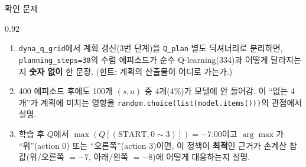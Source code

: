 \begin{frame}{확인 문제}
\begin{center}\begin{varwidth}{0.92\textwidth}
  \begin{enumerate}
    \item {} \texttt{dyna\_q\_grid}에서 계획 갱신(3번
      단계)을 \texttt{Q\_plan} 별도 딕셔너리로 분리하면,
      \texttt{planning\_steps=30}의 수렴 에피소드가 순수
      Q-learning(334)과 어떻게 달라지는지 \textbf{숫자 없이}
      한 문장. (힌트: 계획의 산출물이 어디로 가는가.)
    \item {} 400 에피소드 후에도 100개 $(s,a)$ 중
      4개(4\%)가 모델에 안 들어감. 이 ``없는 4개''가 계획에
      미치는 영향을 \texttt{random.choice(list(model.items()))}의
      관점에서 설명.
    \item {} 학습 후 $Q$에서
      $\max(Q[(\text{START}, 0\sim3)]) = -7.00$이고
      $\arg\max$가 ``위''(action 0) 또는 ``오른쪽''(action 3)이면,
      이 정책이 \textbf{최적}인 근거가 손계산 참값(위/오른쪽 $=-7$,
      아래/왼쪽 $=-8$)에 어떻게 대응하는지 설명.
  \end{enumerate}
\end{varwidth}\end{center}
\end{frame}
